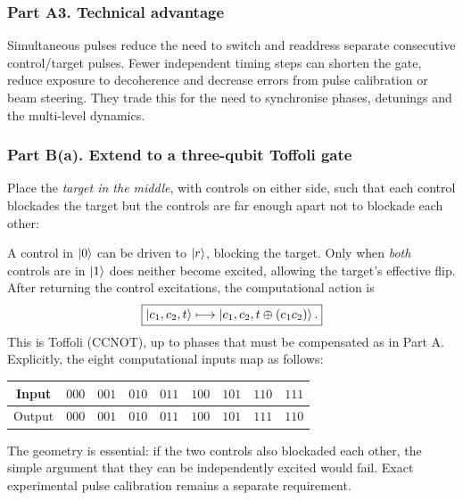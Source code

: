 \subsubsection*{Part A3. Technical advantage}
Simultaneous pulses reduce the need to switch and readdress separate consecutive control/target pulses. Fewer independent timing steps can shorten the gate, reduce exposure to decoherence and decrease errors from pulse calibration or beam steering. They trade this for the need to synchronise phases, detunings and the multi-level dynamics.

\subsubsection*{Part B(a). Extend to a three-qubit Toffoli gate}
Place the \emph{target in the middle}, with controls on either side, such that each control blockades the target but the controls are far enough apart not to blockade each other:
\begin{center}
\end{center}
A control in $\left\lvert 0\right\rangle$ can be driven to $\left\lvert r\right\rangle$, blocking the target. Only when \emph{both} controls are in $\left\lvert 1\right\rangle$ does neither become excited, allowing the target's effective flip. After returning the control excitations, the computational action is
\begin{equation}\boxed{\left\lvert c_1,c_2,t\right\rangle\longmapsto\left\lvert c_1,c_2,t\oplus(c_1c_2)\right\rangle.}\end{equation}
This is Toffoli (CCNOT), up to phases that must be compensated as in Part A. Explicitly, the eight computational inputs map as follows:
\begin{center}\small
\begin{tabular}{@{}c*{8}{c}@{}}\toprule
Input&$000$&$001$&$010$&$011$&$100$&$101$&$110$&$111$\\\midrule
Output&$000$&$001$&$010$&$011$&$100$&$101$&$111$&$110$\\\bottomrule
\end{tabular}\end{center}
The geometry is essential: if the two controls also blockaded each other, the simple argument that they can be independently excited would fail. Exact experimental pulse calibration remains a separate requirement.